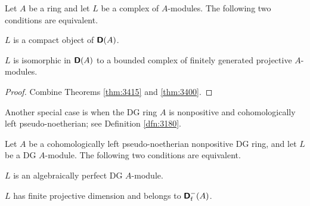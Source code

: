 \begin{cor} \label{cor:4170}
Let $A$ be a ring and let $L$ be a complex of $A$-modules. The following two 
conditions are equivalent.
\begin{itemize}
  $L$ is a compact object of $\boldsymbol{\mathsf{D}}(A)$.

 $L$ is isomorphic in $\boldsymbol{\mathsf{D}}(A)$ to a bounded complex of 
finitely generated projective $A$-modules.
\end{itemize} 
\end{cor}

\begin{proof}
Combine Theorems \ref{thm:3415} and \ref{thm:3400}.
\end{proof}

Another special case is when the DG ring $A$ is nonpositive and cohomologically 
left pseudo-noetherian; see Definition \ref{dfn:3180}.

\begin{thm} \label{thm:3416}
Let $A$ be a cohomologically left pseudo-noetherian nonpositive DG ring,
and let $L$ be a DG $A$-module. The following two conditions are 
equivalent.
\begin{itemize}
  $L$ is an algebraically perfect DG $A$-module. 

 $L$ has finite projective dimension and belongs to 
$\boldsymbol{\mathsf{D}}^{-}_{\mathrm{f}}(A)$.
\end{itemize}
\end{thm}

